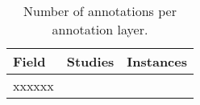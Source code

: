 \documentclass[preview=true]{standalone}
\begin{document}
\begin{table}[ht]
	\footnotesize
	\begin{tabularx}{\linewidth}{XXl}%
		\toprule
		\textbf{Field} &\textbf{Studies}&\textbf{Instances}\\
		\midrule
		xxxxxx
		\bottomrule
	\end{tabularx}
	\caption{Number of annotations per annotation layer.} %
	\label{tab:annotation}
\end{table}
\end{document}
